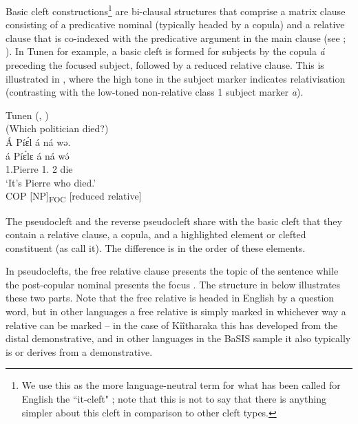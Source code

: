 \documentclass[output=paper]{langscibook}
\begin{document}
Basic cleft constructions\footnote{We use this as the more language-neutral term for what has been called for English the ``it-cleft" \citep{LafkiouiEtAl2016}; note that this is not to say that there is anything simpler about this cleft in comparison to other cleft types.} are bi-clausal structures that comprise a matrix clause consisting of a predicative nominal (typically headed by a copula) and a relative clause that is co-indexed with the predicative argument in the main clause (see \citealt[1949]{Jespersen1937}; \citealt[467]{Lambrecht2001}). In Tunen for example, a basic cleft is formed for subjects by the copula \textit{á} preceding the focused subject, followed by a reduced relative clause. This is illustrated in , where the high tone in the subject marker indicates relativisation (contrasting with the low-toned non-relative class 1 subject marker \textit{a}).

\ea
Tunen (, \cite{chapters/tunen})\\
\label{bkm:Ref151383611}
(Which politician died?)\\
Á Píɛ́l á ná wə.\\
\gll
á	Píɛ́lɛ	á	ná	wə́\\
\COP{}  1.Pierre  1\SM.\REL{}  \PST{}2  die\\
\glt
‘It’s Pierre who died.’\\

\glt COP   [NP]\textsubscript{FOC}   [reduced relative]
\z

The pseudocleft and the reverse pseudocleft \citep[see][]{Collins1991,Higgins2015} share with the basic cleft that they contain a relative clause, a copula, and a highlighted element \citep[482]{Collins1991} or clefted constituent (as \citealt{HedbergFadden2007} call it). The difference is in the order of these elements.

In pseudoclefts, the free relative clause presents the topic of the sentence while the post-copular nominal presents the focus \citep{HedbergFadden2007,É.Kiss1998}. The structure in  below illustrates these two parts. Note that the free relative is headed in English by a question word, but in other languages a free relative is simply marked in whichever way a relative can be marked – in the case of Kîîtharaka this has developed from the distal demonstrative, and in other languages in the BaSIS sample it also typically is or derives from a demonstrative.
\end{document}
